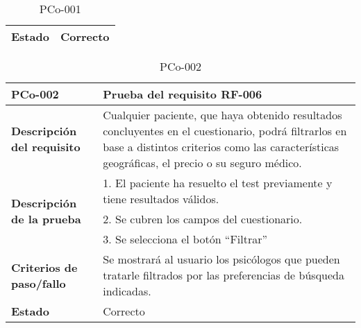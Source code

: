 \begin{table}[htpb]
\begin{tabularx}{\textwidth}{|l|X|}
\textbf{Estado}                                    & Correcto                                                                                                                                                                                                                                                                           \\ \hline
\end{tabularx}
\caption{PCo-001}
\end{table}


\begin{table}[htpb]
\centering
\begin{tabularx}{\textwidth}{|l|X|}
\hline
\rowcolor[gray]{0.9}\textbf{PCo-002}                                     & \textbf{Prueba del requisito RF-006}                                                                                                                                                                  \\ \hline
\textbf{Descripción del requisito}                  & Cualquier paciente, que haya obtenido resultados concluyentes en el cuestionario, podrá  filtrarlos en base a distintos criterios como las características geográficas, el precio o su seguro médico. \\ \hline
\multirow{3}{*}{\textbf{Descripción de la prueba}} & 1. El paciente ha resuelto el test previamente y tiene resultados válidos.                                                                                                                            \\ \cline{2-2} 
                                                   & 2. Se cubren los campos del cuestionario.                                                                                                                                                             \\ \cline{2-2} 
                                                   & 3. Se selecciona el botón ``Filtrar''
\\ \hline
\textbf{Criterios de paso/fallo}                   & Se mostrará al usuario los psicólogos que pueden tratarle filtrados por las preferencias de búsqueda indicadas.                                                                                       \\ \hline
\textbf{Estado}                                    & Correcto                                                                                                                                                                                              \\ \hline
\end{tabularx}
\caption{PCo-002}
\end{table}


